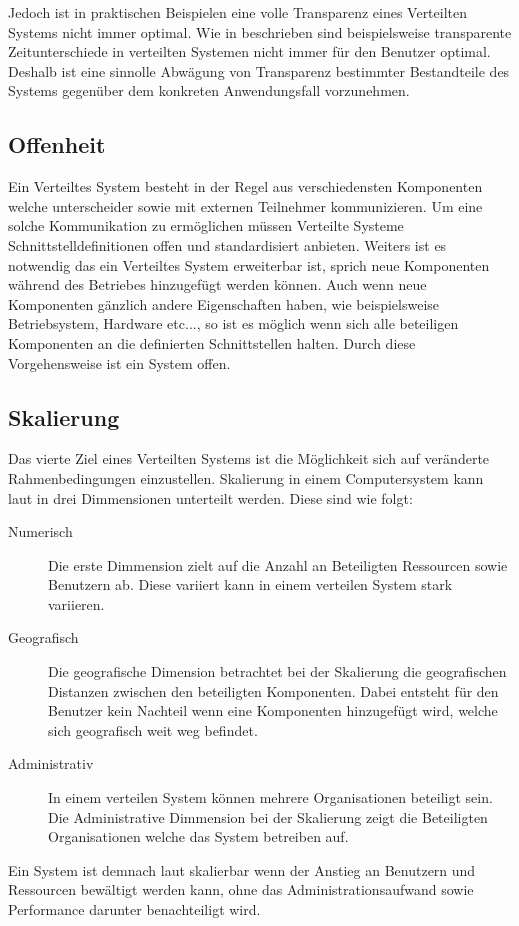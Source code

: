 Jedoch ist in praktischen Beispielen eine volle Transparenz eines Verteilten Systems nicht immer optimal. Wie in \cite{tanenbaum2007distributed} beschrieben sind beispielsweise transparente Zeitunterschiede in verteilten Systemen nicht immer für den Benutzer optimal. Deshalb ist eine sinnolle Abwägung von Transparenz bestimmter Bestandteile des Systems gegenüber dem konkreten Anwendungsfall vorzunehmen. 

\subsection{Offenheit}\label{sec:distributedSystems:goales:openness} 
Ein Verteiltes System besteht in der Regel aus verschiedensten Komponenten welche unterscheider sowie mit externen Teilnehmer kommunizieren. Um eine solche Kommunikation zu ermöglichen müssen Verteilte Systeme Schnittstelldefinitionen offen und standardisiert anbieten. Weiters ist es notwendig das ein Verteiltes System erweiterbar ist, sprich neue Komponenten während des Betriebes hinzugefügt werden können. Auch wenn neue Komponenten gänzlich andere Eigenschaften haben, wie beispielsweise Betriebsystem, Hardware etc..., so ist es möglich wenn sich alle beteiligen Komponenten an die definierten Schnittstellen halten. Durch diese Vorgehensweise ist ein System offen.  

\subsection{Skalierung}\label{sec:distributedSystems:goales:scalability} 
Das vierte Ziel eines Verteilten Systems ist die Möglichkeit sich auf veränderte Rahmenbedingungen einzustellen. Skalierung in einem Computersystem kann laut \cite{Neuman1993Scale} in drei Dimmensionen unterteilt werden. Diese sind wie folgt: 
\begin{description}
    \item[Numerisch] Die erste Dimmension zielt auf die Anzahl an Beteiligten Ressourcen sowie Benutzern ab. Diese variiert kann in einem verteilen System stark variieren.
    \item[Geografisch] Die geografische Dimension betrachtet bei der Skalierung die geografischen Distanzen zwischen den beteiligten Komponenten. Dabei entsteht für den Benutzer kein Nachteil wenn eine Komponenten hinzugefügt wird, welche sich geografisch weit weg befindet.
    \item[Administrativ] In einem verteilen System können mehrere Organisationen beteiligt sein. Die Administrative Dimmension bei der Skalierung zeigt die Beteiligten Organisationen welche das System betreiben auf.
\end{description}
Ein System ist demnach laut \cite{Neuman1993Scale} skalierbar wenn der Anstieg an Benutzern und Ressourcen bewältigt werden kann, ohne das Administrationsaufwand sowie Performance darunter benachteiligt wird. \\

